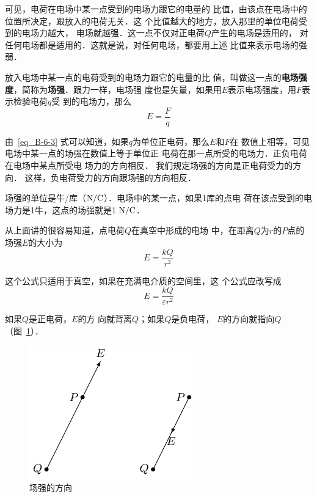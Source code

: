 可见，电荷在电场中某一点受到的电场力跟它的电量的
比值，由该点在电场中的位置所决定，跟放入的电荷无关．这
个比值越大的地方，放入那里的单位电荷受到的电场力越大，
电场就越强．这一点不仅对正电荷$Q$产生的电场是适用的，
对任何电场都是适用的．这就是说，对任何电场，都要用上述
比值来表示电场的强弱．

放入电场中某一点的电荷受到的电场力跟它的电量的比
值，叫做这一点的\textbf{电场强度}，简称为\textbf{场强}．跟力一样，电场强
度也是矢量，如果用$E$表示电场强度，用$F$表示检验电荷$q$受
到的电场力，那么
\begin{equation}\label{eq_B-6-3}
    E=\frac{F}{q}
\end{equation}

由~\eqref{eq_B-6-3} 式可以知道，如果$q$为单位正电荷，那么$E$和$F$在
数值上相等，可见电场中某一点的场强在数值上等于单位正
电荷在那一点所受的电场力．正负电荷在电场中某点所受电
场力的方向相反．
我们规定场强的方向是正电荷受力的方向．
这样，负电荷受力的方向跟场强的方向相反．

场强的单位是牛/库（$\text{N}/\text{C}$）．电场中的某一点，如果1库的点电
荷在该点受到的电场力是1牛，这点的场强就是1$\;\text{N}/\text{C}$．

从上面讲的很容易知道，点电荷$Q$在真空中形成的电场
中，在距离$Q$为$r$的$P$点的场强$E$的大小为
\begin{equation}\label{eq_B-6-4}
    E=\frac{kQ}{r^2}
\end{equation}

这个公式只适用于真空，如果在充满电介质的空间里，这
个公式应改写成
\begin{equation}\label{eq_B-6-5}
    E=\frac{kQ}{\varepsilon r^2}
\end{equation}

如果$Q$是正电荷，$E$的方
向就背离$Q$；如果$Q$是负电荷，
$E$的方向就指向$Q$（图~\ref{fig_B_6-5}）．
\begin{figure}[htbp]
    \centering
    \includegraphics{fig/B/6-5.pdf}
    \caption{场强的方向}\label{fig_B_6-5}
\end{figure}

